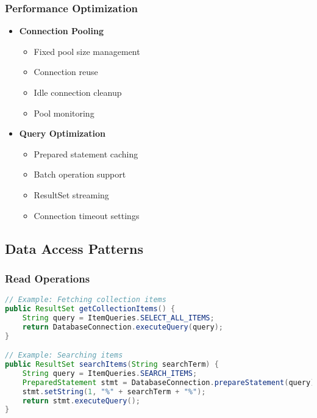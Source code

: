 \documentclass[12pt,a4paper]{article}
\begin{document}
\subsubsection{Performance Optimization}
\begin{itemize}
    \item \textbf{Connection Pooling}
    \begin{itemize}
        \item Fixed pool size management
        \item Connection reuse
        \item Idle connection cleanup
        \item Pool monitoring
    \end{itemize}
    
    \item \textbf{Query Optimization}
    \begin{itemize}
        \item Prepared statement caching
        \item Batch operation support
        \item ResultSet streaming
        \item Connection timeout settings
    \end{itemize}
\end{itemize}

\subsection{Data Access Patterns}

\subsubsection{Read Operations}
\begin{lstlisting}[language=Java]
// Example: Fetching collection items
public ResultSet getCollectionItems() {
    String query = ItemQueries.SELECT_ALL_ITEMS;
    return DatabaseConnection.executeQuery(query);
}

// Example: Searching items
public ResultSet searchItems(String searchTerm) {
    String query = ItemQueries.SEARCH_ITEMS;
    PreparedStatement stmt = DatabaseConnection.prepareStatement(query);
    stmt.setString(1, "%" + searchTerm + "%");
    return stmt.executeQuery();
}
\end{lstlisting}
\end{document}
